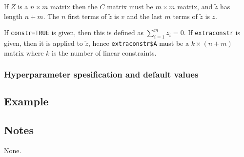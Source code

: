 \documentclass[a4paper,11pt]{article}
\begin{document}
If $Z$ is a $n\times m$ matrix then the $C$ matrix must be $m\times m$
matrix, and $\widetilde z$ has length $n+m$. The $n$ first terms of
$\widetilde z$ is $v$ and the last $m$ terms of $\widetilde z$ is $z$.

If \texttt{constr=TRUE} is given, then this is defined as
$\sum_{i=1}^{m}z_{i} = 0$. If \texttt{extraconstr} is given, then it
is applied to $\widetilde z$, hence \texttt{extraconstr\$A} must be a
$k\times (n+m)$ matrix where $k$ is the number of linear constraints.

\subsubsection*{Hyperparameter spesification and default values}



\subsection*{Example}

{\small}

\subsection*{Notes}

None.
\end{document}

